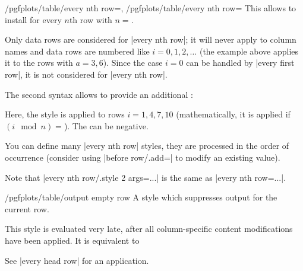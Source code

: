 \begin{keylist}{%
    /pgfplots/table/every nth row=,
    /pgfplots/table/every nth row=%
}
    This allows to install  for every $n$th row with
    $n=$.
\begin{codeexample}[pre={\begin{lateximage}},post={\end{lateximage}}]
\end{codeexample}
    Only data rows are considered for |every nth row|; it will never apply to
    column names and data rows are numbered like $i=0,1,2,\dotsc$ (the example
    above applies it to the rows with $a = 3,6$). Since the case $i=0$ can be
    handled by |every first row|, it is not considered for |every nth row|.

    The second syntax allows to provide an additional :
\begin{codeexample}[pre={\begin{lateximage}},post={\end{lateximage}}]
\end{codeexample}
    \noindent Here, the style is applied to rows $i=1,4,7,10$ (mathematically,
    it is applied if $(i \mod n) = $). The  can
    be negative.

    You can define many |every nth row| styles, they are processed in the order
    of occurrence (consider using |before row/.add=| to modify an existing value).

    Note that |every nth row/.style 2 args=...| is the same as
    |every nth row=...|.
\end{keylist}

\begin{stylekey}{/pgfplots/table/output empty row}
    A style which suppresses output for the current row.

    This style is evaluated very late, after all column-specific content
    modifications have been applied. It is equivalent to
\begin{codeexample}
\end{codeexample}

    See |every head row| for an application.
\end{stylekey}


